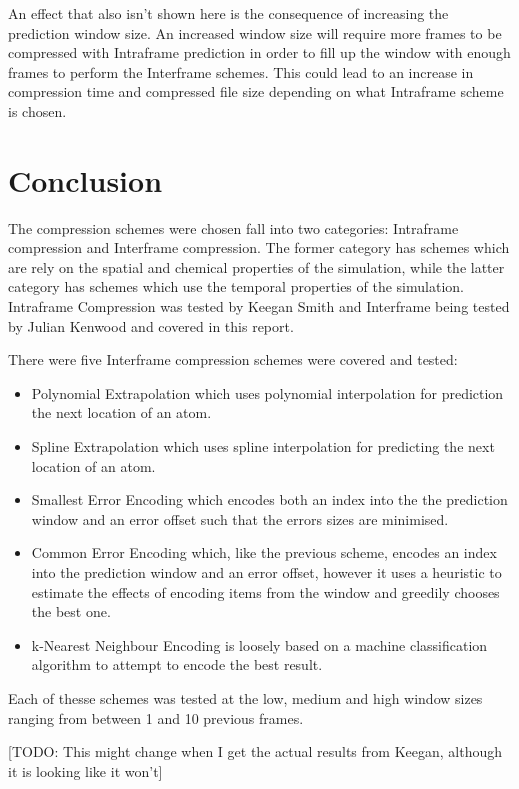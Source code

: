 \documentclass[a4paper,11pt]{report}
\begin{document}
An effect that also isn't shown here is the consequence of increasing the prediction window size. An increased window size will require more frames to be compressed with Intraframe prediction in order to fill up the window with enough frames to perform the Interframe schemes. This could lead to an increase in compression time and compressed file size depending on what Intraframe scheme is chosen. 

\chapter{Conclusion}

The compression schemes were chosen fall into two categories: Intraframe compression and Interframe compression. The former category has schemes which are rely on the spatial and chemical properties of the simulation, while the latter category has schemes which use the temporal properties of the simulation. Intraframe Compression was tested by Keegan Smith and Interframe being tested by Julian Kenwood and covered in this report. 

There were five Interframe compression schemes were covered and tested:

\begin{itemize}
 \item Polynomial Extrapolation which uses polynomial interpolation for prediction the next location of an atom.
 \item Spline Extrapolation which uses spline interpolation for predicting the next location of an atom.
 \item Smallest Error Encoding which encodes both an index into the the prediction window and an error offset such that the errors sizes are minimised.
 \item Common Error Encoding which, like the previous scheme, encodes an index into the prediction window and an error offset, however it uses a heuristic to estimate the effects of encoding items from the window and greedily chooses the best one.
 \item k-Nearest Neighbour Encoding is loosely based on a machine classification algorithm to attempt to encode the best result. 
\end{itemize}

Each of thesse schemes was tested at the low, medium and high window sizes ranging from between 1 and 10 previous frames. 

[TODO: This might change when I get the actual results from Keegan, although it is looking like it won't]
\end{document}
